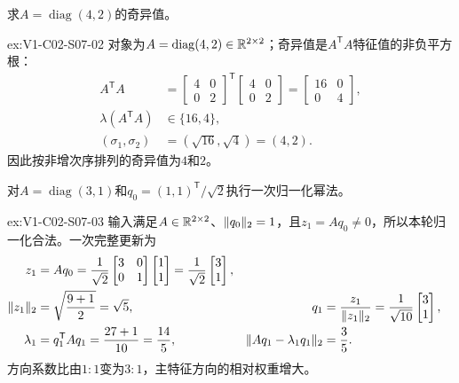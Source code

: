 \begin{SLChapterExercisePairSection}
\begin{exercise}[奇异值]\label{ex:V1-C02-S07-02}
求$A=\operatorname{diag}(4,2)$的奇异值。
\end{exercise}
\label{sol:V1-C02-S07-02}
\begin{chapterexercisesolution}{ex:V1-C02-S07-02}
对象为$A=\operatorname{diag}(4,2)\in\mathbb{R}^{2\times2}$；奇异值是$A^{\mathsf T}A$特征值的非负平方根：
\[
\begin{aligned}
A^{\mathsf T}A
&=\begin{bmatrix}4&0\\0&2\end{bmatrix}^{\mathsf T}
\begin{bmatrix}4&0\\0&2\end{bmatrix}
=\begin{bmatrix}16&0\\0&4\end{bmatrix},\\
\lambda(A^{\mathsf T}A)&\in\{16,4\},\\
(\sigma_1,\sigma_2)&=(\sqrt{16},\sqrt4)=(4,2).
\end{aligned}
\]
因此按非增次序排列的奇异值为$4$和$2$。
\end{chapterexercisesolution}

\begin{exercise}[幂法一步]\label{ex:V1-C02-S07-03}
对$A=\operatorname{diag}(3,1)$和$q_0=(1,1)^{\mathsf T}/\sqrt2$执行一次归一化幂法。
\end{exercise}
\label{sol:V1-C02-S07-03}
\begin{chapterexercisesolution}{ex:V1-C02-S07-03}
输入满足$A\in\mathbb{R}^{2\times2}$、$\lVert q_0\rVert_2=1$，且$z_1=Aq_0\ne0$，所以本轮归一化合法。一次完整更新为
\[
\begin{aligned}
z_1&=Aq_0
=\frac1{\sqrt2}\begin{bmatrix}3&0\\0&1\end{bmatrix}
\begin{bmatrix}1\\1\end{bmatrix}
=\frac1{\sqrt2}\begin{bmatrix}3\\1\end{bmatrix},\\
\lVert z_1\rVert_2&=\sqrt{\frac{9+1}{2}}=\sqrt5,
&q_1&=\frac{z_1}{\lVert z_1\rVert_2}=\frac1{\sqrt{10}}\begin{bmatrix}3\\1\end{bmatrix},\\
\lambda_1&=q_1^{\mathsf T}Aq_1=\frac{27+1}{10}=\frac{14}{5},
&\lVert Aq_1-\lambda_1q_1\rVert_2&=\frac35.
\end{aligned}
\]
方向系数比由$1:1$变为$3:1$，主特征方向的相对权重增大。
\end{chapterexercisesolution}


\end{SLChapterExercisePairSection}
